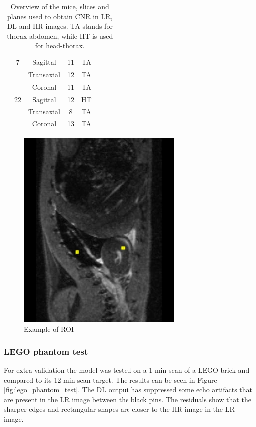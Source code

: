 \documentclass[twocolumn]{article}
\begin{document}
\begin{table}[h]
{\begin{tabular}{l|c|c|c|c|c|c|c}
    \midrule
     & 7  & Sagittal & 11            &TA              &                 &                 &                   \\
     &    & Transaxial & 12            &TA              &                 &                 &                   \\
     &    & Coronal & 11            &TA              &                 &                 &                   \\
    \midrule
     & 22 & Sagittal & 12            &HT              &                 &                 &                   \\
     &    & Transaxial & 8            &TA              &                 &                 &                   \\
     &    & Coronal & 13            &TA              &                 &                 &                   \\
     \bottomrule
    \end{tabular}
    }
    \caption{\label{tab:CNR} Overview of the mice, slices and planes used to obtain CNR in LR, DL and HR images. TA stands for thorax-abdomen, while HT is used for head-thorax.}
\end{table}

\begin{figure}
    \centering
    \includegraphics[width=0.35\linewidth]{CNR.jpeg}
    \caption{Example of ROI}
    \label{fig:CNR}
\end{figure}


\subsubsection{LEGO phantom test}
For extra validation the model was tested on a 1 min scan of a LEGO brick and compared to its 12 min scan target. The results can be seen in Figure \ref{fig:lego_phantom_test}.
The DL output has suppressed some echo artifacts that are present in the LR image between the black pins. The residuals show that the sharper edges and rectangular shapes are closer to the HR image in the LR image.
\end{document}
